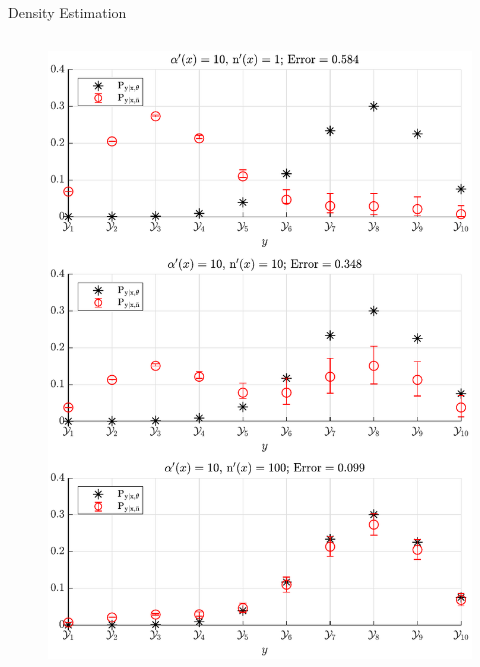 \documentclass[xcolor=dvipsnames]{beamer}
\begin{document}
\begin{frame}{}
\begin{columns}[T]
\begin{column}{.34\linewidth}
\begin{block}{Density Estimation}
\begin{columns}[t]
\begin{column}{.5\linewidth}
\begin{figure}
\centering
\includegraphics[width=0.9\linewidth]{P_yx_error_a0_10.pdf}
\end{figure}

\end{column}
\end{columns}



\end{block}  
    
\end{column}




\end{columns}


\end{frame}
\end{document}
